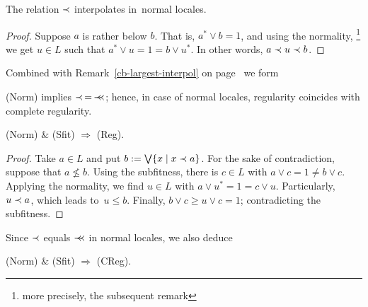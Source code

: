 \begin{lem}
  The relation $\prec$ interpolates in~normal locales.
\end{lem}
\begin{proof}
  Suppose $a$ is rather below $b$.
  That is, $a^* \vee b = 1$, and using the normality,\thinspace%
  \footnote{more precisely, the subsequent remark}
  we get $u\in L$ such that
  $a^* \vee u = 1 = b \vee u^*$.
  In other words, $a \prec u \prec b$.
\end{proof}

Combined with Remark~\ref{cb-largest-interpol} on
page~\pageref{cb-largest-interpol} we form

\begin{cor}
  (Norm) implies $\prec \, = \, \prec\mkern-8mu\prec$;
  hence, in case of normal locales, regularity coincides with complete
  regularity.
\end{cor}

\begin{thm}
  (Norm) $\&$ (Sfit) $\Rightarrow$ (Reg).
\end{thm}
\begin{proof}
  Take $a\in L$ and put $b := \bigvee \{x \mid x \prec a\}$.
  For the sake of contradiction, suppose that $a\not\le b$.
  Using the subfitness, there is $c\in L$ with $a \vee c = 1 \ne b \vee c$.
  Applying the normality, we find $u\in L$ with $a \vee u^* = 1 = c \vee u$.
  Particularly, $u \prec a$, which leads to~$u \le b$.
  Finally, $b \vee c \ge u \vee c = 1$; contradicting the subfitness.
\end{proof}

Since $\prec$ equals $\prec\mkern-8mu\prec$ in normal locales, we also deduce

\begin{cor}
  (Norm) $\&$ (Sfit) $\Rightarrow$ (CReg).
\end{cor}
